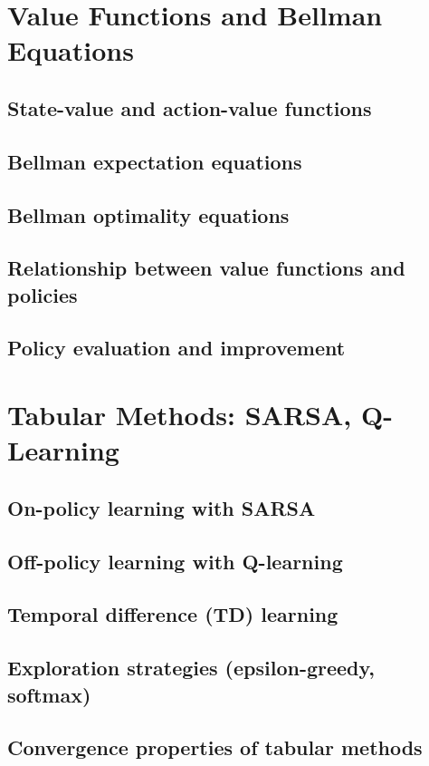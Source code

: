 \section{Value Functions and Bellman Equations}
\subsection{State-value and action-value functions}
\subsection{Bellman expectation equations}
\subsection{Bellman optimality equations}
\subsection{Relationship between value functions and policies}
\subsection{Policy evaluation and improvement}

\section{Tabular Methods: SARSA, Q-Learning}
\subsection{On-policy learning with SARSA}
\subsection{Off-policy learning with Q-learning}
\subsection{Temporal difference (TD) learning}
\subsection{Exploration strategies (epsilon-greedy, softmax)}
\subsection{Convergence properties of tabular methods}


